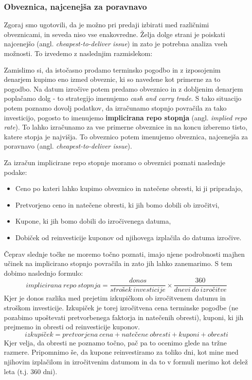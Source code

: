 \documentclass[a4paper]{article}
\begin{document}

\subsubsection{Obveznica, najcenejša za poravnavo}
Zgoraj smo ugotovili, da je možno pri predaji izbirati med različnimi obveznicami, in seveda niso
vse enakovredne. Želja dolge strani je poiskati najcenejšo (angl. \textit{cheapest-to-deliver
issue}) in zato je potrebna analiza vseh možnosti. To izvedemo z naslednjim razmislekom:

Zamislimo si, da istočasno prodamo terminsko pogodbo in z izposojenim denarjem kupimo eno 
izmed obveznic, ki so navedene kot primerne za to pogodbo. Na datum izročive potem predamo 
obveznico in z dobljenim denarjem poplačamo dolg - to strategijo imenujemo \textit{cash 
and carry trade}. S tako situacijo potem poznamo dovolj podatkov, da izračunamo stopnjo 
povračila za tako investicijo, pogosto to imenujemo \textbf{implicirana repo stopnja} 
(angl. \textit{implied repo rate}). To lahko izračunamo za vse primerne obveznice in na 
koncu izberemo tisto, katere stopja je najvišja. To obveznico potem imenujemo obveznica, 
najcenejša za poravnavo (angl. \textit{cheapest-to-deliver issue}).

Za izračun implicirane repo stopnje moramo o obveznici poznati naslednje podake:

\begin{itemize}
    \item Ceno po kateri lahko kupimo obveznico in natečene obresti, ki ji pripradajo,
    \item Pretvorjeno ceno in natečene obresti, ki jih bomo dobili ob izročitvi, 
    \item Kupone, ki jih bomo dobili do izročivenega datuma,
    \item Dobiček od reinvesticije kuponov od njihovega izplačila do datuma izročive.
\end{itemize}

Čeprav slednje točke ne moremo točno poznati, imajo njene podrobnosti majhen učinek na 
implicirano stopnjo povračila in zato jih lahko zanemarimo. S tem dobimo naslednjo formulo:
%
$$ implicirana\:repo\:stopnja = \frac{donos}{strošek\:investicije} \times
\frac{360}{dnevi\:do\:izročitve} $$
%
Kjer je donos razlika med prejetim izkupičkom ob izročitvenem datumu in stroškom investicije.
Izkupiček je torej izročitvena cena terminske pogodbe (ne pozabimo upoštevati pretvorbenega 
faktorja in natečenih obresti), kuponi, ki jih prejmemo in obresti od reinvesticije kuponov. 
%
$$ izkupiček = pretvorjena\:cena + natečene\:obresti + kuponi + obresti $$
%
Kjer velja, da obresti ne poznamo točno, pač pa to ocenimo glede na tržne razmere. Pripomnimo
še, da kupone reinvestiramo za toliko dni, kot mine med njihovim izplačilom in izročitvenim
datumom in da to v formuli merimo kot delež leta (t.j. $360$ dni). 
\end{document}
